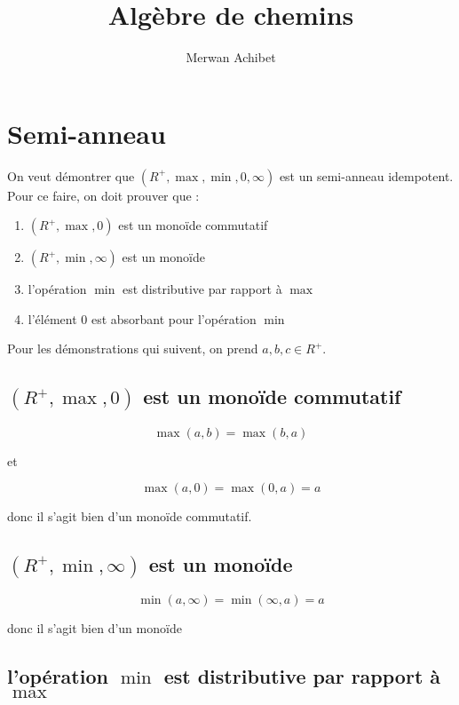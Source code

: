 \documentclass{article}
\title{Algèbre de chemins}
\author{Merwan Achibet}
\date{}
\begin{document}
\maketitle

\section{Semi-anneau}

On veut démontrer que $(R^+, \operatorname{max}, \operatorname{min}, 0, \infty)$ est
un semi-anneau idempotent. Pour ce faire, on doit prouver que :

\begin{enumerate}
  \item{$(R^+, \operatorname{max}, 0)$ est un monoïde commutatif}
  \item{$(R^+, \operatorname{min}, \infty)$ est un monoïde}
  \item{l'opération $\operatorname{min}$ est distributive par rapport à $\operatorname{max}$}
  \item{l'élément $0$ est absorbant pour l'opération $\operatorname{min}$}
\end{enumerate}

Pour les démonstrations qui suivent, on prend $a, b, c \in R^+$.

\subsection{$(R^+, \operatorname{max}, 0)$ est un monoïde commutatif}

$$
\operatorname{max}(a, b) = \operatorname{max}(b, a)
$$

et

$$
\operatorname{max}(a, 0) = \operatorname{max}(0, a) = a
$$

donc il s'agit bien d'un monoïde commutatif.

\subsection{$(R^+, \operatorname{min}, \infty)$ est un monoïde}

$$
\operatorname{min}(a, \infty) = \operatorname{min}(\infty, a) = a
$$

donc il s'agit bien d'un monoïde

\subsection{l'opération $\operatorname{min}$ est distributive par rapport à $\operatorname{max}$}
\end{document}
